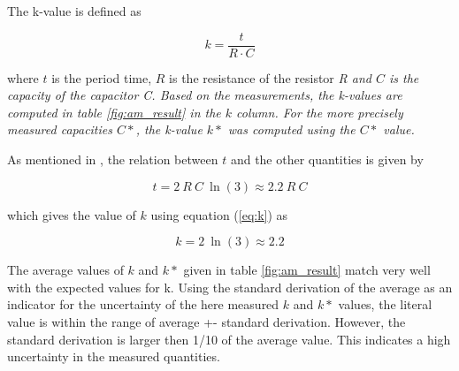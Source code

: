 \documentclass[journal]{IEEEtran}
\begin{document}
The k-value is defined as

\begin{equation}
	k = \frac{t}{R \cdot C}
	\label{eq:k}
\end{equation}

where $t$ is the period time, $R$ is the resistance of the resistor
\em{R} and $C$ is the capacity of the capacitor \em{C}. Based on the
measurements, the k-values are computed in table \ref{fig:am_result} in the $k$
column. For the more precisely measured capacities $C*$, the k-value $k*$ was
computed using the $C*$ value.

As mentioned in \cite{book_dg}, the relation between $t$ and the other
quantities is given by

\begin{equation}
	t = 2~R~C~\ln(3) \approx 2.2~R~C
\end{equation}

which gives the value of $k$ using equation (\ref{eq:k}) as

\begin{equation}
	k = 2~\ln(3) \approx 2.2
	\label{eq:k_lit}
\end{equation}

The average values of $k$ and $k*$ given in table \ref{fig:am_result} match very
well with the expected values for k. Using the standard derivation of the average as
an indicator for the uncertainty of the here measured $k$ and $k*$ values, the
literal value is within the range of average +- standard derivation. However,
the standard derivation is larger then 1/10 of the average value. This indicates
a high uncertainty in the measured quantities.
\end{document}

